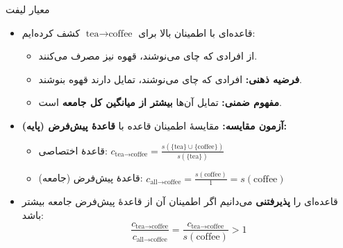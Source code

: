 \begin{frame}{معیار لیفت}{}
\begin{itemize}\setlength{\itemsep}{2pt}\small
    \item قاعده‌ای با اطمینان بالا برای $\text{tea} \to \text{coffee}$ کشف کرده‌ایم:
    \begin{itemize}\footnotesize\setlength{\itemsep}{1pt}
        \item {} از افرادی که چای می‌نوشند، قهوه نیز مصرف می‌کنند.
        \item \textbf{فرضیه ذهنی:} افرادی که چای می‌نوشند، تمایل دارند قهوه بنوشند.
        \item \textbf{مفهوم ضمنی:} تمایل آن‌ها \textbf{بیشتر از میانگین کل جامعه} است.
    \end{itemize}
    \item \textbf{آزمون مقایسه:} مقایسهٔ اطمینان قاعده با \textbf{قاعدهٔ پیش‌فرض (پایه):}
    \begin{itemize}\footnotesize\setlength{\itemsep}{1pt}
        \item قاعدهٔ اختصاصی:
        $c_{\text{tea} \to \text{coffee}} = \frac{s(\{\text{tea}\} \cup \{\text{coffee}\})}{s(\{\text{tea}\})}$
        \item قاعدهٔ پیش‌فرض (جامعه):
        $c_{\text{all} \to \text{coffee}} = \frac{s(\text{coffee})}{1} = s(\text{coffee})$
    \end{itemize}
    \item قاعده‌ای را \textbf{پذیرفتنی} می‌دانیم اگر اطمینان آن از قاعدهٔ پیش‌فرض جامعه بیشتر باشد:
    \[
    \frac{c_{\text{tea} \to \text{coffee}}}{c_{\text{all} \to \text{coffee}}} = \frac{c_{\text{tea} \to \text{coffee}}}{s(\text{coffee})} > 1
    \]
\end{itemize}
\end{frame}

